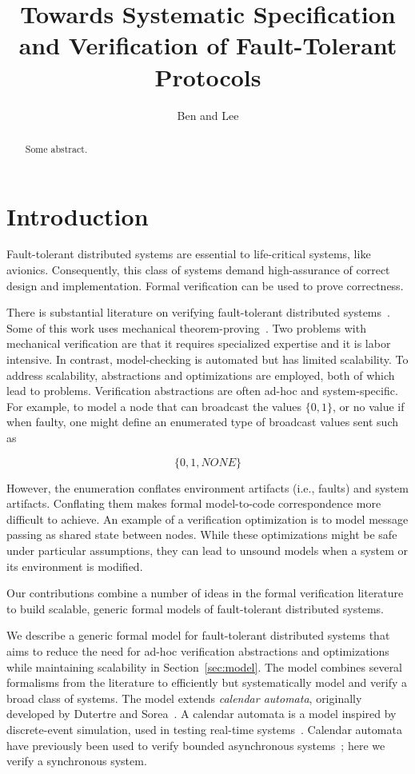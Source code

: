 \documentclass{IEEEtran/IEEEtran}
\begin{document}
\title{Towards Systematic Specification and Verification of Fault-Tolerant Protocols}
\author{Ben and Lee}


\maketitle


\begin{abstract}
  Some abstract.
\end{abstract}

\section{Introduction}

Fault-tolerant distributed systems are essential to life-critical systems, like avionics. Consequently, this class of systems demand high-assurance of correct design and implementation. Formal verification can be used to prove correctness.

There is substantial literature on verifying fault-tolerant distributed systems~\cite{}. Some of this work uses mechanical theorem-proving~\cite{}. Two problems with mechanical verification are that it requires specialized expertise and it is labor intensive. In contrast, model-checking is automated but has limited scalability. To address scalability, abstractions and optimizations are employed, both of which lead to problems. Verification abstractions are often ad-hoc and system-specific. For example, to model a node that can broadcast the values $\{0, 1\}$, or no value if when faulty, one might define an enumerated type of broadcast values sent such as

$$\{0, 1, NONE\}$$

However, the enumeration conflates environment artifacts (i.e., faults) and system artifacts. Conflating them makes formal model-to-code correspondence more difficult to achieve. An example of a verification optimization is to model message passing as shared state between nodes. While these optimizations might be safe under particular assumptions, they can lead to unsound models when a system or its environment is modified.

Our contributions combine a number of ideas in the formal verification literature to build scalable, generic formal models of fault-tolerant distributed systems.

We describe a generic formal model for fault-tolerant distributed systems that aims to reduce the need for ad-hoc verification abstractions and optimizations while maintaining scalability in Section~\ref{sec:model}. The model combines several formalisms from the literature to efficiently but systematically model and verify a broad class of systems. The model extends \emph{calendar automata}, originally developed by Dutertre and Sorea~\cite{Dutertre-Sorea}. A calendar automata is a model inspired by discrete-event simulation, used in testing real-time systems~\cite{}.  Calendar automata have previously been used to verify bounded asynchronous systems~\cite{}; here we verify a synchronous system.
\end{document}
